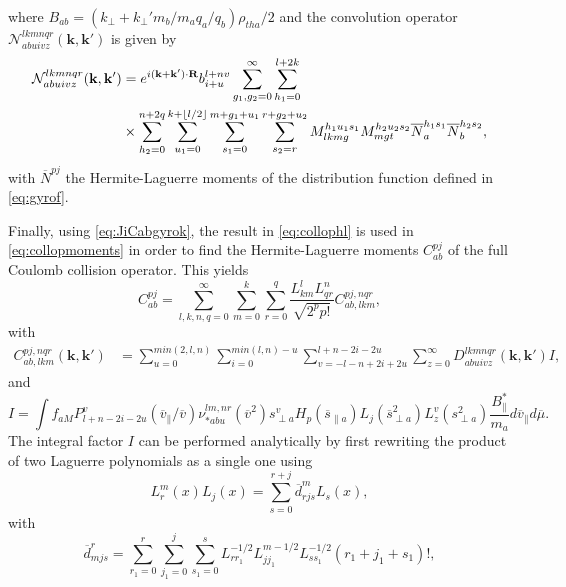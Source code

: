 %
where $B_{ab}=(k_\perp + k_\perp' {m_b/m_a}q_a/q_b) \rho_{tha}/2$ and the convolution operator $\mathcal{N}_{abuivz}^{lkmnqr}(\mathbf k, \mathbf k')$ is given by
%
\begin{align}
    \mathcal{N}_{abuivz}^{lkmnqr}(\mathbf k, \mathbf k')&=e^{i(\mathbf k + \mathbf k')\cdot \mathbf R} {b_{i+u}^{l+n v}} \sum_{g_1,g_2=0}^\infty\sum_{h_1=0}^{l+2k}\nonumber\\
    &\times\sum_{h_2=0}^{n+2q}\sum_{u_1=0}^{k+\lfloor l/2\rfloor}\sum_{s_1=0}^{m+g_1+u_1}\sum_{s_2=r}^{r+g_2+u_2}M_{lkmg}^{h_1 u_1 s_1}M_{mgt}^{h_2 u_2 s_2} \overline N_a^{h_1 s_1} \overline N_b^{h_2 s_2},
\end{align}
%
with $\overline N^{pj}$ the Hermite-Laguerre moments of the distribution function defined in \cref{eq:gyrof}.

Finally, using \cref{eq:JiCabgyrok}, the result in \cref{eq:collophl} is used in \cref{eq:collopmoments} in order to find the Hermite-Laguerre moments $C_{ab}^{pj}$ of the full Coulomb collision operator.
%
This yields
%
\begin{equation}
    C_{ab}^{pj}=\sum_{l,k,n,q=0}^\infty\sum_{m=0}^k\sum_{r=0}^q \frac{L_{km}^l L_{qr}^n}{\sqrt{2^p p!}} C_{ab,lkm}^{pj,nqr},
\label{eq:hermitelaguerrecpj2}
\end{equation}
with
%
\begin{align}
    C_{ab,lkm}^{pj,nqr}(\mathbf k, \mathbf k') &=\sum_{u=0}^{min(2,l,n)}\sum_{i=0}^{min(l,n)-u} \sum_{v=-l-n+2i+2u}^{l+n-2i-2u}\sum_{z=0}^\infty D_{abuivz}^{lkmnqr}(\mathbf k, \mathbf k') I,
\label{eq:collmomentsfinal}
\end{align}
%
and
\begin{equation}
    I = \int f_{aM} P_{l+n-2i-2u}^v(\overline v_\parallel /\overline v){\nu_{*abu}^{lm,nr}(\overline v^2)} s_{\perp a}^v H_p(\overline s_{\parallel a})L_j(\overline s_{\perp a}^2) L_z^v(s_{\perp a}^2) \frac{B_\parallel^{*}}{m_a}d \overline v_\parallel d \overline \mu.
\end{equation}
%
The integral factor $I$ can be performed analytically by first rewriting the product of two Laguerre polynomials as a single one using
%
\begin{equation}
    L_r^m(x)L_j(x)=\sum_{s=0}^{r+j}\overline d_{rjs}^m L_s(x),
\end{equation}
%
with
%
\begin{equation}
    \overline d^r_{mjs}=\sum_{r_1=0}^r \sum_{j_1=0}^j \sum_{s_1=0}^s L_{r r_1}^{-1/2} L_{j j_1}^{m-1/2} L_{s s_1}^{-1/2} (r_1+j_1+s_1)!,
\end{equation}
